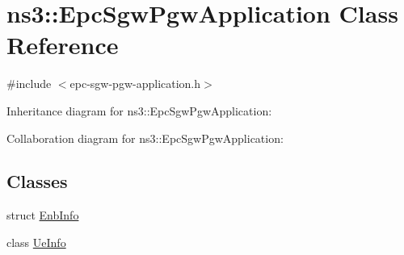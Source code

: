 \hypertarget{classns3_1_1EpcSgwPgwApplication}{}\section{ns3\+:\+:Epc\+Sgw\+Pgw\+Application Class Reference}
\label{classns3_1_1EpcSgwPgwApplication}


{\ttfamily \#include $<$epc-\/sgw-\/pgw-\/application.\+h$>$}



Inheritance diagram for ns3\+:\+:Epc\+Sgw\+Pgw\+Application\+:


Collaboration diagram for ns3\+:\+:Epc\+Sgw\+Pgw\+Application\+:
\subsection*{Classes}
\begin{DoxyCompactItemize}
\item 
struct \hyperlink{structns3_1_1EpcSgwPgwApplication_1_1EnbInfo}{Enb\+Info}
\item 
class \hyperlink{classns3_1_1EpcSgwPgwApplication_1_1UeInfo}{Ue\+Info}
\end{DoxyCompactItemize}
